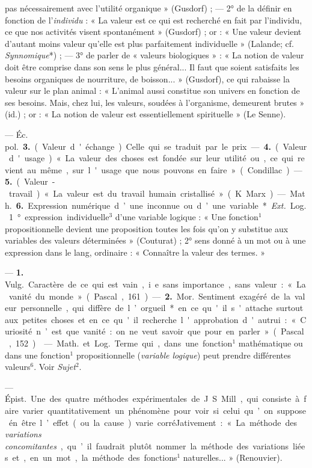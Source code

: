 \begin{itemize}[leftmargin=1cm, label=, itemsep=1pt]
[même] pas nécessairement avec l'utilité organique » (Gusdorf) ; — 2° de la
définir en fonction de l'{\it individu} : « La valeur est ce qui est
recherché en fait par l'individu, ce que nos activités visent spontanément
» (Gusdorf) ; or : « Une valeur devient d'autant moins valeur qu’elle est
plus parfaitement individuelle » (Lalande; cf. {\it Synnomique}*) ; — 3° de
parler de « valeurs biologiques » : « La notion de valeur doit être comprise
dans son sens le plus général... Il faut que soient satisfaits les besoins
organiques de nourriture, de boisson... » (Gusdorf), ce qui rabaisse la
valeur sur le plan animal : « L'animal aussi constitue son univers en
fonction de ses besoins. Mais, chez lui, les valeurs, soudées à l'organisme,
demeurent brutes » (id.) ; or : « La notion de valeur est essentiellement
spirituelle » (Le Senne).

— \si{Éc. pol.}  {\bf 3.} (Valeur d'échange). Celle qui se traduit par le
prix. —  {\bf 4.} (Valeur d'usage). « La valeur des choses est fondée sur
leur utilité ou, ce qui revient au même, sur l'usage
que nous pouvons en faire » (Condillac). —  {\bf 5.} (Valeur-travail). « La
valeur est du travail humain cristallisé » (K. Marx).

— \si{Math.}  {\bf 6.} Expression numérique d’une inconnue ou d’une
variable*. {\it Ext.} \si{Log.} 1° expression individuelle$^3$ d’une variable
logique : « Une fonction$^1$ propositionnelle devient une proposition toutes
les fois qu'on y substitue aux variables des valeurs déterminées
» (Couturat) ; 2° sens donné à un mot ou à une expression dans le lang,
ordinaire : « Connaître la valeur des termes. »

 — {\bf 1.} \si{Vulg.} Caractère de ce qui est vain, i.e. sans
importance, sans valeur : « La vanité du monde » (Pascal, 161). — {\bf 2.}
\si{Mor.} Sentiment exagéré de la valeur personnelle, qui diffère de
l’orgueil* en ce qu'il s'attache surtout aux petites choses et en ce qu'il
recherche l'approbation d'autrui : « Curiosité n’est que vanité : on ne veut
savoir que pour en parler » (Pascal, 152).

 — \si{Math.} et \si{Log.} Terme qui, dans une fonction$^1$
mathématique ou dans une fonction$^1$ propositionnelle ({\it variable
logique}) peut prendre différentes valeurs$^6$. Voir {\it Sujet}$^2$.

 — \si{Épist.} Une des quatre
méthodes expérimentales de J. S. Mill, qui consiste à faire varier
quantitativement un phénomène pour voir si celui qu’on suppose én être
l’effet (ou la cause) varie corréJativement : « La méthode des {\it
variations concomitantes}, qu’il faudrait plutôt nommer la méthode des
variations liées et, en un mot, la méthode des fonctions$^1$ naturelles...
» (Renouvier).


\end{itemize}
